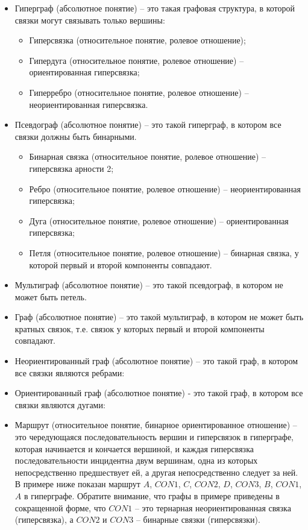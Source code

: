 \begin{itemize}
\item Гиперграф (абсолютное понятие) – это такая графовая структура, в
  которой связки могут связывать только вершины:
  \begin{itemize}
  \item Гиперсвязка (относительное понятие, ролевое отношение);
  \item Гипердуга (относительное понятие, ролевое отношение) –
    ориентированная гиперсвязка;
  \item Гиперребро (относительное понятие, ролевое отношение) –
    неориентированная гиперсвязка.
  \end{itemize}

\item Псевдограф (абсолютное понятие) – это такой гиперграф, в котором
  все связки должны быть бинарными.
  \begin{itemize}
  \item Бинарная связка (относительное понятие, ролевое отношение)
    – гиперсвязка арности 2; 
  \item Ребро (относительное понятие, ролевое
    отношение) – неориентированная гиперсвязка;
  \item Дуга (относительное понятие, ролевое отношение) –
    ориентированная гиперсвязка;
  \item Петля (относительное понятие, ролевое отношение) – бинарная
    связка, у которой первый и второй компоненты совпадают.
  \end{itemize}

\item Мультиграф (абсолютное понятие) – это такой псевдограф, в
  котором не может быть петель.
 
\item Граф (абсолютное понятие) – это такой мультиграф, в котором не
  может быть кратных связок, т.е. связок у которых первый и второй
  компоненты совпадают.
 
\item Неориентированный граф (абсолютное понятие) – это такой граф, в
  котором все связки являются ребрами:
 
\item Ориентированный граф (абсолютное понятие) - это такой граф, в
  котором все связки являются дугами:
 
\item Маршрут (относительное понятие, бинарное ориентированное
  отношение) – это чередующаяся последовательность вершин и
  гиперсвязок в гиперграфе, которая начинается и кончается вершиной, и
  каждая гиперсвязка последовательности инцидентна двум вершинам, одна
  из которых непосредственно предшествует ей, а другая непосредственно
  следует за ней. В примере ниже показан маршрут $A$, $CON1$, $C$,
  $CON2$, $D$, $CON3$, $B$, $CON1$, $A$ в гиперграфе. Обратите внимание, что
  графы в примере приведены в сокращенной форме, что $CON1$ – это
  тернарная неориентированная связка (гиперсвязка), а $CON2$ и $CON3$ –
  бинарные связки (гиперсвязки).
 

\end{itemize}
